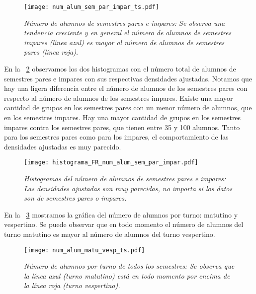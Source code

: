 \begin{figure}[H]
\centering
\texttt{[image: num\_alum\_sem\_par\_impar\_ts.pdf]} %
\caption[\textit{Número de alumnos de semestres pares e impares}]{\textit{Número de alumnos de semestres pares e impares: Se observa una tendencia creciente y en general el número de alumnos de semestres impares (línea azul) es mayor al número de alumnos de semestres pares (línea roja).}}\label{NumAlTotal_ParImpar_ts}
\end{figure}


En la \figurename{~\ref{histNumAlTotal_ParImpar}} observamos los dos histogramas con el número total de alumnos de semestres pares e impares con sus respectivas densidades ajustadas. Notamos que hay una ligera diferencia entre el número de alumnos de los semestres pares con respecto al número de alumnos de los semestres impares. Existe una mayor cantidad de grupos en los semestres pares con un menor número de alumnos, que en los semestres impares. Hay una mayor cantidad de grupos en los semestres impares contra los semestres pares, que tienen entre 35 y 100 alumnos. Tanto para los semestres pares como para los impares, el comportamiento de las densidades ajustadas es muy parecido.

\begin{figure}[H]
\centering
\texttt{[image: histograma\_FR\_num\_alum\_sem\_par\_impar.pdf]} %
\caption[\textit{Histogramas del número de alumnos de semestres pares e impares}]{\textit{Histogramas del número de alumnos de semestres pares e impares: Las densidades ajustadas son muy parecidas, no importa si los datos son de semestres pares o impares.}}\label{histNumAlTotal_ParImpar}
\end{figure}


En la \figurename{~\ref{NumAlTotal_MatuVesp_ts}} mostramos la gráfica del número de alumnos por turno: matutino y vespertino. Se puede observar que en todo momento el número de alumnos del turno matutino es mayor al número de alumnos del turno vespertino.

\begin{figure}[H]
\centering
\texttt{[image: num\_alum\_matu\_vesp\_ts.pdf]} %
\caption[\textit{Número de alumnos por turno de todos los semestres}]{\textit{Número de alumnos por turno de todos los semestres: Se observa que la línea azul (turno matutino) está en todo momento por encima de la línea roja (turno vespertino).}}\label{NumAlTotal_MatuVesp_ts}
\end{figure}

